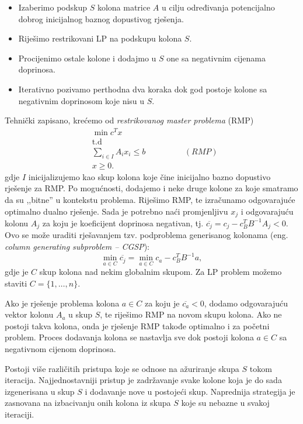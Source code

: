 \documentclass[b5paper, utf8, 11pt, colorlinks]{book}
\theoremstyle{definition}
\begin{document}
\begin{itemize}
   \item Izaberimo podskup $S$ kolona matrice $A$ u cilju određivanja potencijalno dobrog inicijalnog baznog dopustivog rješenja.
    \item Riješimo restrikovani LP na podskupu kolona $S$.
    \item Procijenimo ostale kolone i dodajmo u $S$ one sa negativnim 
          cijenama doprinosa.
    \item Iterativno pozivamo perthodna dva koraka dok god postoje kolone   sa negativnim doprinosom koje nisu u $S$.
\end{itemize}
Tehnički zapisano, krećemo od \emph{restrikovanog master problema} (RMP)
\begin{align*}
    &\min c^T x \\
    &\mbox{t.d} \\
    & \sum_{i \in I} A_i x_i  \leq b \hspace{2cm} (RMP)\\
    & x \geq 0. 
\end{align*}
gdje $I$ inicijalizujemo kao skup kolona koje čine inicijalno bazno dopustivo rješenje  za RMP. Po mogućnosti, dodajemo i neke druge kolone za koje smatramo da su ,,bitne'' u kontekstu problema.  Riješimo RMP,  te izračunamo odgovarajuće optimalno dualno rješenje. Sada je potrebno naći promjenljivu $x_j$ i odgovarajuću kolonu $A_j$ za koju je koeficijent doprinosa negativan, tj. $\overline{c_j} = c_j - c_B^T B^{-1}A_j < 0$.
Ovo se može uraditi rješavanjem tzv. podproblema generisanog kolonama (eng. \emph{column generating subproblem -- CGSP}):
$$\min_{a \in C} \overline{c_j} = \min_{a \in C} c_a - c_B^T B^{-1} a,$$
gdje je $C$ skup kolona nad nekim globalnim skupom. Za LP problem možemo staviti $C = \{1,\ldots,n\}$. 

Ako je rješenje problema kolona $a \in C$ za koju je $\overline{c_a}<0$, dodamo odgovarajuću vektor kolonu $A_a$ u skup $S$, te riješimo  RMP na novom skupu kolona. Ako ne postoji takva kolona, onda je rješenje RMP takođe optimalno i za početni problem. %
 Proces dodavanja kolona se nastavlja sve dok postoji kolona $a\in C$ sa negativnom cijenom doprinosa. 

Postoji više različitih pristupa koje se odnose na ažuriranje skupa $S$ tokom iteracija. 
Najjednostavniji pristup je zadržavanje svake kolone koja je do sada izgenerisana  u skup $S$ i dodavanje  nove u postojeći skup. Naprednija strategija je zasnovana na izbacivanju onih kolona iz skupa $S$ koje su nebazne u svakoj iteraciji. 
\end{document}
